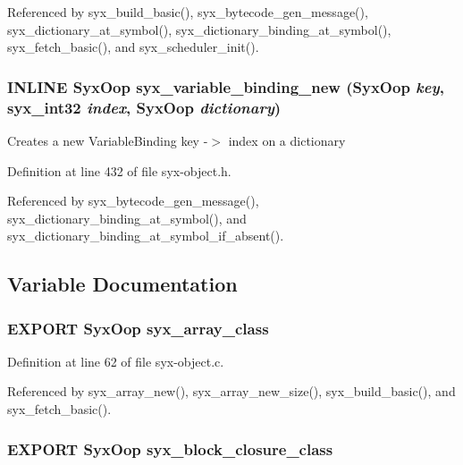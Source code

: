 Referenced by syx\_\-build\_\-basic(), syx\_\-bytecode\_\-gen\_\-message(), syx\_\-dictionary\_\-at\_\-symbol(), syx\_\-dictionary\_\-binding\_\-at\_\-symbol(), syx\_\-fetch\_\-basic(), and syx\_\-scheduler\_\-init().\hypertarget{syx-object_8h_d806df239dc9f2669f3620623ec77c6f}{
\subsubsection{\setlength{\rightskip}{0pt plus 5cm}INLINE {\bf SyxOop} syx\_\-variable\_\-binding\_\-new ({\bf SyxOop} {\em key}, \/  {\bf syx\_\-int32} {\em index}, \/  {\bf SyxOop} {\em dictionary})}}
\label{syx-object_8h_d806df239dc9f2669f3620623ec77c6f}


Creates a new VariableBinding key -$>$ index on a dictionary 

Definition at line 432 of file syx-object.h.

Referenced by syx\_\-bytecode\_\-gen\_\-message(), syx\_\-dictionary\_\-binding\_\-at\_\-symbol(), and syx\_\-dictionary\_\-binding\_\-at\_\-symbol\_\-if\_\-absent().

\subsection{Variable Documentation}
\hypertarget{syx-object_8h_93a0ea8cd9172fdef4a6b60b40fd0e4e}{
\subsubsection{\setlength{\rightskip}{0pt plus 5cm}EXPORT {\bf SyxOop} {\bf syx\_\-array\_\-class}}}
\label{syx-object_8h_93a0ea8cd9172fdef4a6b60b40fd0e4e}




Definition at line 62 of file syx-object.c.

Referenced by syx\_\-array\_\-new(), syx\_\-array\_\-new\_\-size(), syx\_\-build\_\-basic(), and syx\_\-fetch\_\-basic().\hypertarget{syx-object_8h_80d6a707deae30357e97c83c75473f14}{
\subsubsection{\setlength{\rightskip}{0pt plus 5cm}EXPORT {\bf SyxOop} {\bf syx\_\-block\_\-closure\_\-class}}}
\label{syx-object_8h_80d6a707deae30357e97c83c75473f14}




